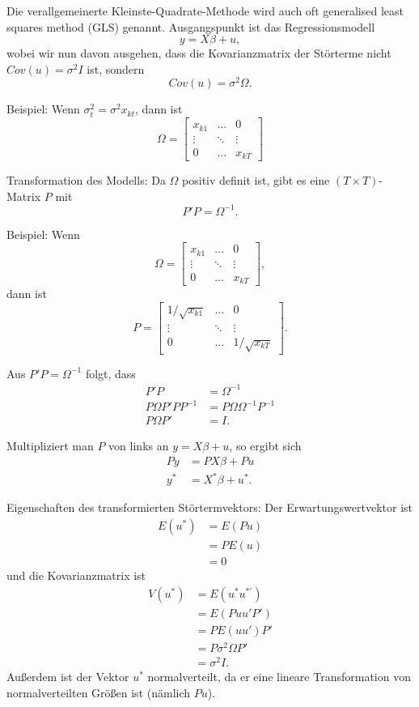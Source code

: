 \documentclass{article}
\begin{document}
Die verallgemeinerte Kleinste-Quadrate-Methode wird auch oft 
generalised least squares method (GLS) genannt.  Ausgangspunkt ist das
Regressionsmodell
\[ y=X\beta+u, \]
wobei wir nun davon ausgehen, dass die Kovarianzmatrix der Störterme
nicht $Cov(u)=\sigma ^{2}I$ ist, sondern 
\[ Cov(u)=\sigma^2\Omega. \]

Beispiel: Wenn $\sigma _{t}^{2}=\sigma ^{2}x_{kt}$, dann ist
\[ \Omega=\left[ 
\begin{array}{lll}
x_{k1} & \ldots & 0 \\ 
\vdots & \ddots & \vdots \\ 
0 & \ldots & x_{kT}%
\end{array}%
\right] \]

Transformation des Modells: Da $\Omega$ positiv definit ist, 
gibt es eine $(T\times T)$-Matrix $P$ mit
\[ P'P=\Omega^{-1}. \]

Beispiel: Wenn
\[ \Omega=\left[ 
\begin{array}{lll}
x_{k1} & \ldots & 0 \\ 
\vdots & \ddots & \vdots \\ 
0 & \ldots & x_{kT}%
\end{array}%
\right], \]
dann ist
\[ P=\left[ 
\begin{array}{lll}
1/\sqrt{x_{k1}} & \ldots & 0 \\ 
\vdots & \ddots & \vdots \\ 
0 & \ldots & 1/\sqrt{x_{kT}}%
\end{array}%
\right]. \]

Aus $P'P=\Omega^{-1}$ folgt, dass
\begin{align*}
P'P &=\Omega^{-1} \\
P\Omega P'PP^{-1} &= P\Omega\Omega^{-1}P^{-1} \\
P\Omega P'&=I.
\end{align*}

Multipliziert man $P$ von links an $y=X\beta+u$,
so ergibt sich
\begin{align*}
Py &=PX\beta+Pu \\
y^{\ast } &=X^{\ast }\beta+u^{\ast }.
\end{align*}

Eigenschaften des transformierten Störtermvektors:
Der Erwartungswertvektor ist
\begin{align*}
E(u^{\ast }) &=E(Pu) \\
&=PE(u) \\
&=0
\end{align*}
und die Kovarianzmatrix ist
\begin{align*}
V(u^{\ast }) &=E(u^{\ast }u^{\ast \prime }) \\
&=E(Puu'P') \\
&=PE(uu')P' \\
&=P\sigma ^{2}\Omega P' \\
&=\sigma ^{2}I.
\end{align*}
Außerdem ist der Vektor $u^*$ normalverteilt, da er eine lineare Transformation
von normalverteilten Größen ist (nämlich $Pu$).
\end{document}
